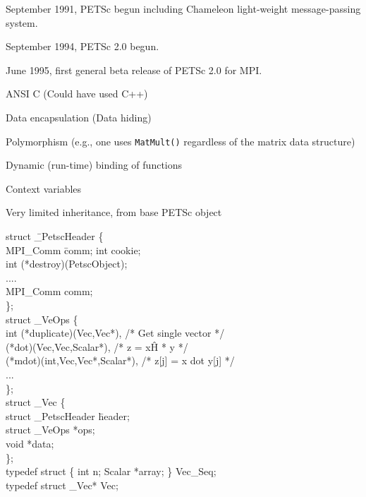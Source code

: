 
\vspace{1in}

September 1991, PETSc begun including Chameleon light-weight
 message-passing system.

September 1994, PETSc 2.0 begun.

June 1995, first general beta release of PETSc 2.0 for MPI.
\ve


ANSI C (Could have used C++)

Data encapsulation (Data hiding)

Polymorphism (e.g., one uses {\tt MatMult()} regardless of the matrix 
              data structure)

Dynamic (run-time) binding of functions

Context variables

Very limited inheritance, from base PETSc object
\ve

%
%
{\tiny 
\begin{tabbing} 
struct \= \_PetscHeader \{ \\
\>  MPI\_Comm \=   comm;  \kill
\>  int  \>       cookie; \\                     
\>  int  \>       (*destroy)(PetscObject);\\     
\>  ....\\
\>  MPI\_Comm  \>  comm;  \\                      
\};\\
struct \_VeOps \{\\
\>  int \> (*duplicate)(Vec,Vec*),           /*  Get single vector */\\
\> \>       (*dot)(Vec,Vec,Scalar*),          /*  z = x\^H * y */\\
\> \>       (*mdot)(int,Vec,Vec*,Scalar*),    /*  z[j] = x dot y[j] */\\
\>       ...\\
\};\\
struct \_Vec \{\\
\> struct \> \_PetscHeader \= header;\\
\>  struct \> \_VeOps      \> *ops;\\
\>  void \>              \>  *data;\\
\};\\
typedef struct \{ int n; Scalar *array; \} Vec\_Seq;\\
typedef struct \_Vec* Vec;
\end{tabbing}}
\ve


